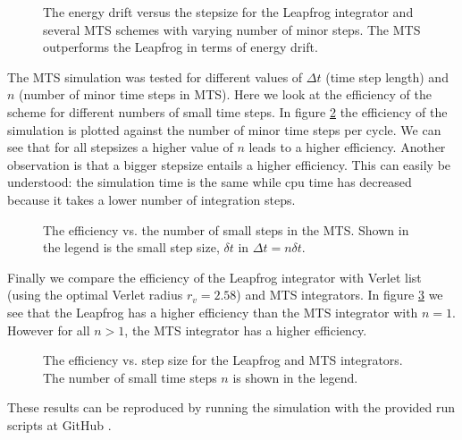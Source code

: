 \documentclass[a4paper]{article}
\begin{document}
\begin{figure}
\caption{The energy drift versus the stepsize for the Leapfrog integrator and several MTS schemes
  with varying number of minor steps. The MTS outperforms the Leapfrog in terms of energy drift.}
\label{fig:energy_drift}
\end{figure}

The MTS simulation was tested for different values of $\Delta t$ (time step length) and $n$ (number
of minor time steps in MTS). Here we look at the efficiency of the scheme for different numbers of
small time steps. In figure \ref{fig:efficiency_multi} the efficiency of the simulation is plotted
against the number of minor time steps per cycle. We can see that for all stepsizes a higher value
of $n$ leads to a higher efficiency. Another observation is that a bigger stepsize entails a higher
efficiency. This can easily be understood: the simulation time is the same while cpu time has
decreased because it takes a lower number of integration steps.

\begin{figure}
\caption{The efficiency vs. the number of small steps in the MTS. Shown in the legend is the small
  step size, $\delta t$ in $\Delta t=n \delta t$.}
\label{fig:efficiency_multi}
\end{figure}

Finally we compare the efficiency of the Leapfrog integrator with Verlet list (using the optimal
Verlet radius $r_v=2.58$) and MTS integrators. In figure \ref{fig:efficiency} we see that the
Leapfrog has a higher efficiency than the MTS integrator with $n=1$. However for all $n>1$, the MTS
integrator has a higher efficiency.

\begin{figure}
\caption{The efficiency vs. step size for the Leapfrog and MTS integrators. The number of small time
  steps $n$ is shown in the legend.}
\label{fig:efficiency}
\end{figure}

These results can be reproduced by running the simulation with the provided run scripts at GitHub
\cite{chronogrator}.
\end{document}

